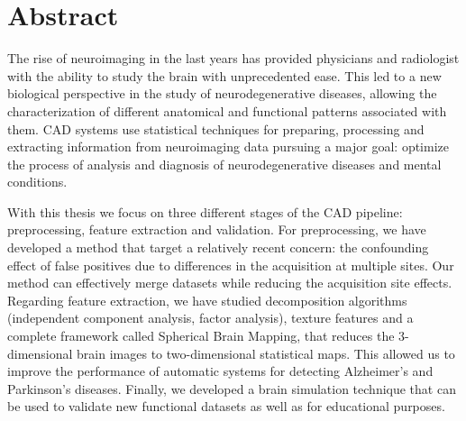 \begingroup

\chapter*{Abstract}
The rise of neuroimaging in the last years has provided physicians and radiologist with the ability to study the brain with unprecedented ease. This led to a new biological perspective in the study of neurodegenerative diseases, allowing the characterization of different anatomical and functional patterns associated with them. \acf{CAD} systems use statistical techniques for preparing, processing and extracting information from neuroimaging data pursuing a major goal: optimize the process of analysis and diagnosis of neurodegenerative diseases and mental conditions.

With this thesis we focus on three different stages of the \ac{CAD} pipeline: preprocessing, feature extraction and validation. For preprocessing, we have developed a method that target a relatively recent concern: the confounding effect of false positives due to differences in the acquisition at multiple sites. Our method can effectively merge datasets while reducing the acquisition site effects. Regarding feature extraction, we have studied decomposition algorithms (independent component analysis, factor analysis), texture features and a complete framework called Spherical Brain Mapping, that reduces the 3-dimensional brain images to two-dimensional statistical maps. This allowed us to improve the performance of automatic systems for detecting Alzheimer's and Parkinson's diseases. Finally, we developed a brain simulation technique that can be used to validate new functional datasets as well as for educational purposes. 

\endgroup			

\vfill
